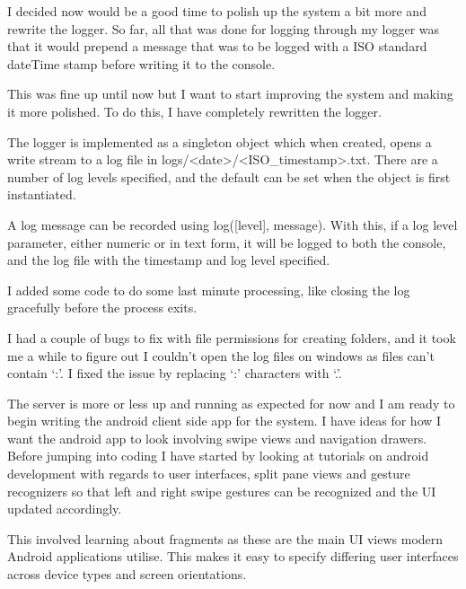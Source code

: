 \documentclass[idxtotoc,hyperref,openany]{labbook} %
\begin{document}

I decided now would be a good time to polish up the system a bit more and rewrite the logger.  So far, all that was done for logging through my logger was that it would prepend a message that was to be logged with a ISO standard dateTime stamp before writing it to the console.

This was fine up until now but I want to start improving the system and making it more polished.  To do this, I have completely rewritten the logger.

The logger is implemented as a singleton object which when created, opens a write stream to a log file in logs/<date>/<ISO\_timestamp>.txt.  There are a number of log levels specified, and the default can be set when the object is first instantiated.

A log message can be recorded using log([level], message).  With this, if a log level parameter, either numeric or in text form, it will be logged to both the console, and the log file with the timestamp and log level specified.

I added some code to do some last minute processing, like closing the log gracefully before the process exits.

I had a couple of bugs to fix with file permissions for creating folders, and it took me a while to figure out I couldn't open the log files on windows as files can't contain `:'.  I fixed the issue by replacing `:' characters with `.'.



The server is more or less up and running as expected for now and I am ready to begin writing the android client side app for the system.  I have ideas for how I want the android app to look involving swipe views and navigation drawers.  Before jumping into coding I have started by looking at tutorials on android development with regards to user interfaces, split pane views and gesture recognizers so that left and right swipe gestures can be recognized and the UI updated accordingly.

This involved learning about fragments as these are the main UI views modern Android applications utilise.  This makes it easy to specify differing user interfaces across device types and screen orientations.


\end{document}
